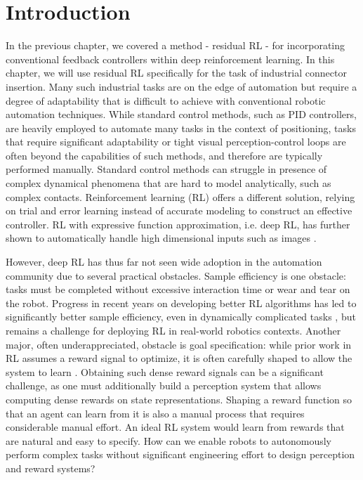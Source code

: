 \section{Introduction}\label{sec:introduction}

In the previous chapter, we covered a method - residual RL - for incorporating conventional feedback controllers within deep reinforcement learning. 
In this chapter, we will use residual RL specifically for the task of industrial connector insertion.
Many such industrial tasks are on the edge of automation but require a degree of adaptability that is difficult to achieve with conventional robotic automation techniques.
While standard control methods, such as PID controllers, are heavily employed to automate many tasks in the context of positioning, tasks that require significant adaptability or tight visual perception-control loops are often beyond the capabilities of such methods, and therefore are typically performed manually.
Standard control methods can struggle in presence of complex dynamical phenomena that are hard to model analytically, such as complex contacts.
Reinforcement learning (RL) offers a different solution, relying on trial and error learning instead of accurate modeling to construct an effective controller.
RL with expressive function approximation, i.e. deep RL, has further shown to automatically handle high dimensional inputs such as images \citep{mnih2013atari}.

However, deep RL has thus far not seen wide adoption in the automation community due to several practical obstacles. 
Sample efficiency is one obstacle: tasks must be completed without excessive interaction time or wear and tear on the robot. Progress in recent years on developing better RL algorithms has led to significantly better sample efficiency, even in dynamically complicated tasks \citep{haarnoja2018sac, hessel2018rainbow},
but remains a challenge for deploying RL in real-world robotics contexts.
Another major, often underappreciated, obstacle is goal specification: while prior work in RL assumes a reward signal to optimize,
it is often carefully shaped to allow the system to learn \citep{ng1999rewardshaping, popov17stacking, daniel2014activereward}. 
Obtaining such dense reward signals can be a significant challenge, as one must additionally build a perception system that allows computing dense rewards on state representations. Shaping a reward function so that an agent can learn from it is also a manual process that requires considerable manual effort. An ideal RL system would learn from rewards that are natural and easy to specify.
How can we enable robots to autonomously perform complex tasks without significant engineering effort to design perception and reward systems?

